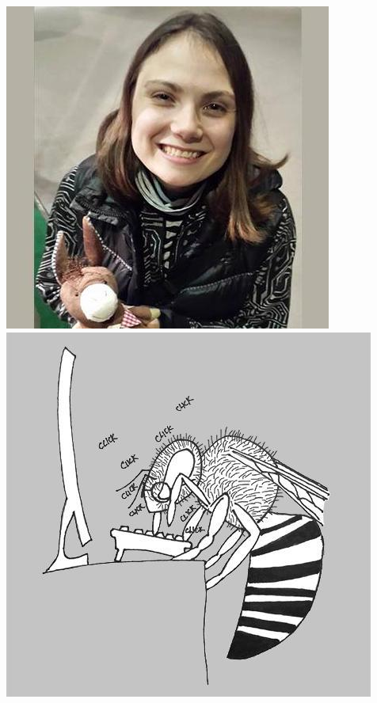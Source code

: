 \documentclass{beamer}
\begin{document}
\begin{frame}
\begin{columns}
\begin{columns}
\includegraphics[width=\textwidth]{Irina.jpg}
\includegraphics[width=\textwidth]{Valentin.jpg}

\end{columns}
\end{columns}
\end{frame}
\end{document}

